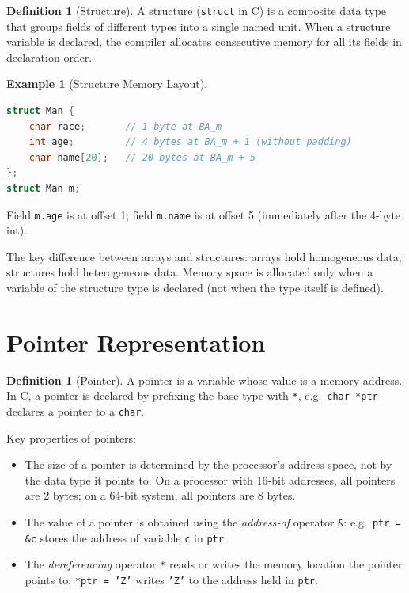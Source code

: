 \documentclass[11pt, a4paper, notitlepage]{report}
\theoremstyle{definition}
\newtheorem{definition}[theorem]{Definition}
\theoremstyle{remark}
\theoremstyle{definition}
\newtheorem{example}[theorem]{Example}
\begin{document}
\begin{definition}[Structure]
\label{def:struct}
A structure (\texttt{struct} in C) is a composite data type that groups fields of different types into a single named unit. When a structure variable is declared, the compiler allocates consecutive memory for all its fields in declaration order.
\end{definition}

\begin{example}[Structure Memory Layout]
\leavevmode
\begin{lstlisting}[language=C]
struct Man {
    char race;       // 1 byte at BA_m
    int age;         // 4 bytes at BA_m + 1 (without padding)
    char name[20];   // 20 bytes at BA_m + 5
};
struct Man m;
\end{lstlisting}
Field \texttt{m.age} is at offset 1; field \texttt{m.name} is at offset 5 (immediately after the 4-byte int).
\end{example}

The key difference between arrays and structures: arrays hold homogeneous data; structures hold heterogeneous data. Memory space is allocated only when a variable of the structure type is declared (not when the type itself is defined).

\section{Pointer Representation}

\begin{definition}[Pointer]
\label{def:pointer}
A pointer is a variable whose value is a memory address. In C, a pointer is declared by prefixing the base type with \texttt{*}, e.g.\ \texttt{char *ptr} declares a pointer to a \texttt{char}.
\end{definition}

Key properties of pointers:

\begin{itemize}
  \item The size of a pointer is determined by the processor's address space, not by the data type it points to. On a processor with 16-bit addresses, all pointers are 2 bytes; on a 64-bit system, all pointers are 8 bytes.
  \item The value of a pointer is obtained using the \emph{address-of} operator \texttt{\&}: e.g.\ \texttt{ptr = \&c} stores the address of variable \texttt{c} in \texttt{ptr}.
  \item The \emph{dereferencing} operator \texttt{*} reads or writes the memory location the pointer points to: \texttt{*ptr = 'Z'} writes \texttt{'Z'} to the address held in \texttt{ptr}.
\end{itemize}
\end{document}

